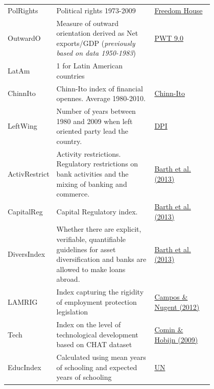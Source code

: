 \begin{refsection}
\begin{subappendices}
\begin{center}
\begin{longtable}{l p{0.50\linewidth} p{0.3\linewidth}}
      PolRights & Political rights 1973-2009 & \href{https://freedomhouse.org/report/freedom-world-2016/methodology}{Freedom House} \\
      
      OutwardO & Measure of outward orientation derived as Net exports/GDP (\textit{previously based on data 1950-1983}) & \href{http://www.rug.nl/research/ggdc/data/pwt/pwt-9.0}{PWT 9.0} \\
      
      LatAm & 1 for Latin American countries & \\
      
      ChinnIto & Chinn-Ito index of financial opennes. Average 1980-2010. & \href{http://web.pdx.edu/~ito/Chinn-Ito_website.htm}{Chinn-Ito} \\ 
    
      LeftWing & Number of years between 1980 and 2009 when left oriented party lead the country. & \href{http://www.nsd.uib.no/macrodataguide/set.html?id=11&sub=1}{DPI} \\
      
      ActivRestrict & Activity restrictions. Regulatory restrictions on bank activities and the mixing of banking and commerce. & \href{http://faculty.haas.berkeley.edu/ross_levine/regulation.htm}{Barth et al. (2013)} \\
      
      CapitalReg & Capital Regulatory index. & \href{http://faculty.haas.berkeley.edu/ross_levine/regulation.htm}{Barth et al. (2013)} \\
      
      DiversIndex & Whether there are explicit, verifiable, quantifiable guidelines for asset diversification and banks are allowed to make loans abroad. & \href{http://faculty.haas.berkeley.edu/ross_levine/regulation.htm}{Barth et al. (2013)} \\
      
      LAMRIG & Index capturing the rigidity of employment protection legislation & \href{https://www.iza.org/publications/dp/6881}{Campos \& Nugent (2012)} \\
    
      Tech & Index on the level of technological development based on CHAT dataset & \href{http://www.nber.org/data/chat/}{Comin \& Hobijn (2009)} \\
    
      EducIndex & Calculated using mean years of schooling and expected years of schooling & \href{http://hdr.undp.org/en/content/education-index}{UN} \\
    

\end{longtable}
\end{center}
\end{subappendices}
\end{refsection}
